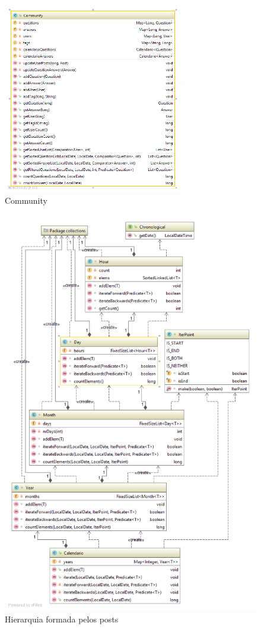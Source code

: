 \documentclass[10pt,a4paper]{report}
\begin{document}
    \begin{figure}[h]
        \centering
        \includegraphics[width=0.7\textwidth]{./images/Community.png}
        \caption{Community}
    \end{figure}

    \begin{figure}[h]
        \centering
        \includegraphics[width=\textwidth]{./images/Calendario.png}
        \caption{Hierarquia formada pelos posts}
        \label{fig:calendario}
    \end{figure}
\end{document}
